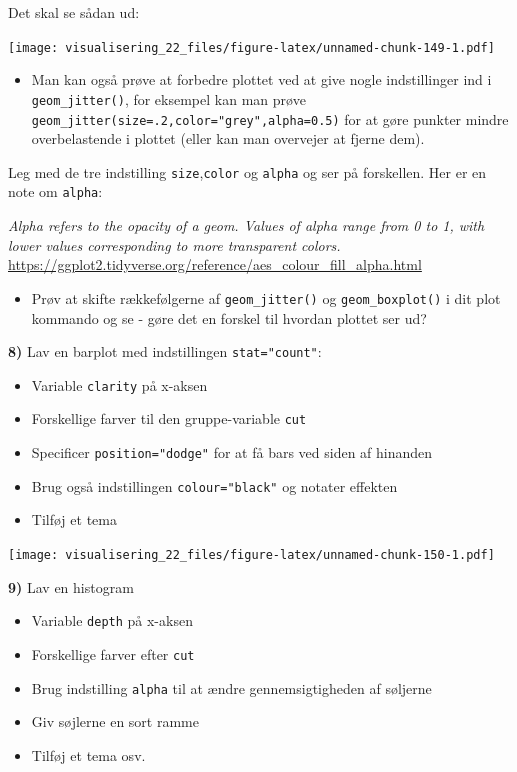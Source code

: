 \documentclass[
]{book}
\providecommand{\tightlist}{%
  \setlength{\itemsep}{0pt}\setlength{\parskip}{0pt}}
\begin{document}
Det skal se sådan ud:

\texttt{[image: visualisering\_22\_files/figure-latex/unnamed-chunk-149-1.pdf]}

\begin{itemize}
\tightlist
\item
  Man kan også prøve at forbedre plottet ved at give nogle indstillinger ind i \texttt{geom\_jitter()}, for eksempel kan man prøve \texttt{geom\_jitter(size=.2,color="grey",alpha=0.5)} for at gøre punkter mindre overbelastende i plottet (eller kan man overvejer at fjerne dem).
\end{itemize}

Leg med de tre indstilling \texttt{size},\texttt{color} og \texttt{alpha} og ser på forskellen. Her er en note om \texttt{alpha}:

\emph{Alpha refers to the opacity of a geom. Values of alpha range from 0 to 1, with lower values corresponding to more transparent colors.} \url{https://ggplot2.tidyverse.org/reference/aes_colour_fill_alpha.html}

\begin{itemize}
\tightlist
\item
  Prøv at skifte rækkefølgerne af \texttt{geom\_jitter()} og \texttt{geom\_boxplot()} i dit plot kommando og se - gøre det en forskel til hvordan plottet ser ud?
\end{itemize}

\textbf{8)} Lav en barplot med indstillingen \texttt{stat="count"}:

\begin{itemize}
\tightlist
\item
  Variable \texttt{clarity} på x-aksen
\item
  Forskellige farver til den gruppe-variable \texttt{cut}
\item
  Specificer \texttt{position="dodge"} for at få bars ved siden af hinanden
\item
  Brug også indstillingen \texttt{colour="black"} og notater effekten
\item
  Tilføj et tema
\end{itemize}

\texttt{[image: visualisering\_22\_files/figure-latex/unnamed-chunk-150-1.pdf]}

\textbf{9)} Lav en histogram

\begin{itemize}
\tightlist
\item
  Variable \texttt{depth} på x-aksen
\item
  Forskellige farver efter \texttt{cut}
\item
  Brug indstilling \texttt{alpha} til at ændre gennemsigtigheden af søljerne
\item
  Giv søjlerne en sort ramme
\item
  Tilføj et tema osv.
\end{itemize}
\end{document}
